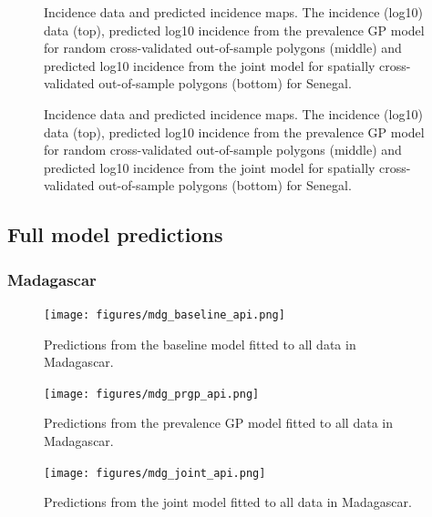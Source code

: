 \documentclass[10pt,a4]{article}
\begin{document}
\begin{figure}[h!]
\caption{\label{predobsmapsen2}
Incidence data and predicted incidence maps.
The incidence (log10) data (top), predicted log10 incidence from the prevalence GP model for random cross-validated out-of-sample polygons (middle) and predicted log10 incidence from the joint model for spatially cross-validated out-of-sample polygons (bottom) for Senegal.
}
\end{figure}



\begin{figure}[h!]
\caption{\label{predobsmapsen3}
Incidence data and predicted incidence maps.
The incidence (log10) data (top), predicted log10 incidence from the prevalence GP model for random cross-validated out-of-sample polygons (middle) and predicted log10 incidence from the joint model for spatially cross-validated out-of-sample polygons (bottom) for Senegal.
}
\end{figure}



\clearpage
\subsection{Full model predictions}
\subsubsection{Madagascar}

\begin{figure}[h!]
\centering

\texttt{[image: figures/mdg\_baseline\_api.png]}

\caption{Predictions from the baseline model fitted to all data in Madagascar.}
\label{baselinemdg}
\end{figure}
\begin{figure}[h!]
\centering

\texttt{[image: figures/mdg\_prgp\_api.png]}

\caption{Predictions from the prevalence GP model fitted to all data in Madagascar.}
\label{gpmdg}
\end{figure}

\begin{figure}[h!]
\centering

\texttt{[image: figures/mdg\_joint\_api.png]}

\caption{Predictions from the joint model fitted to all data in Madagascar.}
\label{jointmdg}
\end{figure}
\end{document}
